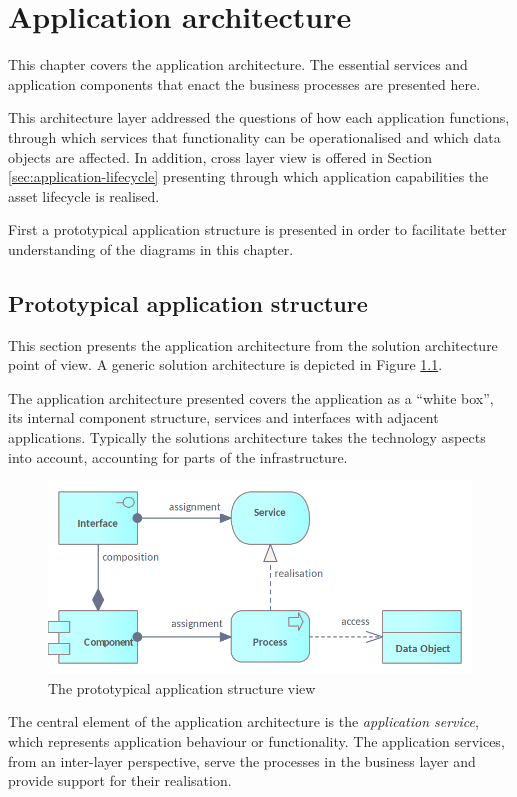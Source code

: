 \chapter{Application architecture}
\label{sec:application-architecture}
	
    This chapter covers the application architecture. The essential services and application components that enact the business processes are presented here.
    
    This architecture layer addressed the questions of how each application functions, through which services that functionality can be operationalised and which data objects are affected. In addition, cross layer view is offered in Section \ref{sec:application-lifecycle} presenting through which application capabilities the asset lifecycle is realised.
    
    First a prototypical application structure is presented in order to facilitate better understanding of the diagrams in this chapter. 

	\section{Prototypical application structure}
	
	This section presents the application architecture from the solution architecture point of view. A generic solution architecture is depicted in Figure \ref{fig:application-view}.
	
	The application architecture presented covers the application as a ``white box'', its internal component structure, services and interfaces with adjacent applications. Typically the solutions architecture takes the technology aspects into account, accounting for parts of the infrastructure.
	
    \begin{figure}[h]
		\centering
		\includegraphics[width=.6\textwidth]{images/views/Application view.png}
		\caption{The prototypical application structure view}
		\label{fig:application-view}
	\end{figure}

	The central element of the application architecture is the \textit{application service}, which represents application behaviour or functionality. The application services, from an inter-layer perspective, serve the processes in the business layer and provide support for their realisation. 
	
